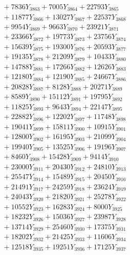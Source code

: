 \documentclass[a4paper,10pt]{article}
\begin{document}
{\begin{align}
&\;  + 7836 Y_{3863} + 7005 Y_{3864} + 22793 Y_{3865} \\[0.3ex]
&\;  + 11877 Y_{3866} + 13027 Y_{3867} + 22537 Y_{3868} \\[0.5ex]\allowbreak
&\;  + 9954 Y_{3869} + 9663 Y_{3870} + 23921 Y_{3871} \\[0.3ex]
&\;  + 23366 Y_{3872} + 19773 Y_{3873} + 23756 Y_{3874} \\[0.3ex]
&\;  + 15639 Y_{3875} + 19300 Y_{3876} + 20593 Y_{3877} \\[0.3ex]
&\;  + 19135 Y_{3878} + 21209 Y_{3879} + 10433 Y_{3880} \\[0.3ex]
&\;  + 14788 Y_{3881} + 17266 Y_{3882} + 12626 Y_{3883} \\[0.3ex]
&\;  + 12180 Y_{3884} + 12190 Y_{3885} + 24667 Y_{3886} \\[0.3ex]
&\;  + 20828 Y_{3887} + 8128 Y_{3888} + 20271 Y_{3889} \\[0.3ex]
&\;  + 8589 Y_{3890} + 15112 Y_{3891} + 19795 Y_{3892} \\[0.3ex]
&\;  + 11825 Y_{3893} + 9643 Y_{3894} + 22147 Y_{3895} \\[0.3ex]
&\;  + 22882 Y_{3896} + 12202 Y_{3897} + 11748 Y_{3898} \\[0.5ex]\allowbreak
&\;  + 19041 Y_{3899} + 15811 Y_{3900} + 10915 Y_{3901} \\[0.3ex]
&\;  + 12800 Y_{3902} + 16195 Y_{3903} + 21099 Y_{3904} \\[0.3ex]
&\;  + 19940 Y_{3905} + 13525 Y_{3906} + 19196 Y_{3907} \\[0.3ex]
&\;  + 8460 Y_{3908} + 15428 Y_{3909} + 9414 Y_{3910} \\[0.3ex]
&\;  + 23000 Y_{3911} + 20430 Y_{3912} + 24810 Y_{3913} \\[0.3ex]
&\;  + 25547 Y_{3914} + 15489 Y_{3915} + 20450 Y_{3916} \\[0.3ex]
&\;  + 21491 Y_{3917} + 24259 Y_{3918} + 23624 Y_{3919} \\[0.3ex]
&\;  + 24043 Y_{3920} + 21820 Y_{3921} + 25278 Y_{3922} \\[0.3ex]
&\;  + 10552 Y_{3923} + 16283 Y_{3924} + 8000 Y_{3925} \\[0.3ex]
&\;  + 18232 Y_{3926} + 15036 Y_{3927} + 23987 Y_{3928} \\[0.5ex]\allowbreak
&\;  + 13714 Y_{3929} + 25460 Y_{3930} + 17375 Y_{3931} \\[0.3ex]
&\;  + 18202 Y_{3932} + 21425 Y_{3933} + 11606 Y_{3934} \\[0.3ex]
&\;  + 12518 Y_{3935} + 19251 Y_{3936} + 17125 Y_{3937} \\[0.3ex]

\end{align}}
\end{document}
